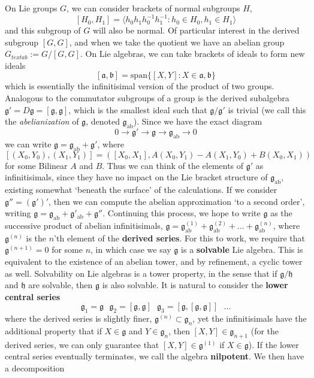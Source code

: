 On Lie groups $G$, we can consider brackets of normal subgroups $H$,
%
\[ [H_0,H_1] = \langle h_0h_1h_0^{-1}h_1^{-1} : h_0 \in H_0, h_1 \in H_1 \rangle \]
%
and this subgroup of $G$ will also be normal. Of particular interest in the derived subgroup $[G,G]$, and when we take the quotient we have an abelian group $G_{text{ab}} := G/[G,G]$. On Lie algebras, we can take brackets of ideals to form new ideals
%
\[ [\mathfrak{a}, \mathfrak{b}] = \text{span} \{ [X,Y] : X \in \mathfrak{a}, \mathfrak{b} \} \]
%
which is essentially the infinitisimal version of the product of two groups. Analogous to the commutator subgroups of a group is the derived subalgebra $\mathfrak{g}' = D\mathfrak{g} = [\mathfrak{g}, \mathfrak{g}]$, which is the smallest ideal such that $\mathfrak{g}/\mathfrak{g}'$ is trivial (we call this the {\it abelianization} of $\mathfrak{g}$, denoted $\mathfrak{g}_{\text{ab}}$). Since we have the exact diagram
%
\[ 0 \to \mathfrak{g}' \to \mathfrak{g} \to \mathfrak{g}_{\text{ab}} \to 0 \]
%
we can write $\mathfrak{g} = \mathfrak{g}_{\text{ab}} + \mathfrak{g}'$, where
%
\[ [(X_0,Y_0),(X_1,Y_1)] = ([X_0,X_1], A(X_0,Y_1) - A(X_1,Y_0) + B(X_0,X_1)) \]
%
for some Bilinear $A$ and $B$. Thus we can think of the elements of $\mathfrak{g}'$ as infinitisimals, since they have no impact on the Lie bracket structure of $\mathfrak{g}_{\text{ab}}$, existing somewhat `beneath the surface' of the calculations. If we consider $\mathfrak{g}'' = (\mathfrak{g}')'$, then we can compute the abelian approximation `to a second order', writing $\mathfrak{g} = \mathfrak{g}_{\text{ab}} + \mathfrak{g}'_{\text{ab}} + \mathfrak{g}''$. Continuing this process, we hope to write $\mathfrak{g}$ as the successive product of abelian infinitisimals, $\mathfrak{g} = \mathfrak{g}^{(1)}_{\text{ab}} + \mathfrak{g}^{(2)}_{\text{ab}} + \dots + \mathfrak{g}^{(n)}_{\text{ab}}$, where $\mathfrak{g}^{(n)}$ is the $n$'th element of the {\bf derived series}. For this to work, we require that $\mathfrak{g}^{(n+1)} = 0$ for some $n$, in which case we say $\mathfrak{g}$ is a {\bf solvable} Lie algebra. This is equivalent to the existence of an abelian tower, and by refinement, a cyclic tower as well. Solvability on Lie algebras is a tower property, in the sense that if $\mathfrak{g}/\mathfrak{h}$ and $\mathfrak{h}$ are solvable, then $\mathfrak{g}$ is also solvable. It is natural to consider the {\bf lower central series}
%
\[ \mathfrak{g}_1 = \mathfrak{g}\ \ \  \mathfrak{g}_2 = [\mathfrak{g}, \mathfrak{g}]\ \ \ \mathfrak{g}_3 = [\mathfrak{g}, [\mathfrak{g}, \mathfrak{g}]]\ \ \  \dots \]
%
where the derived series is slightly finer, $\mathfrak{g}^{(n)} \subset \mathfrak{g}_n$, yet the infinitisimals have the additional property that if $X \in \mathfrak{g}$ and $Y \in \mathfrak{g}_n$, then $[X,Y] \in \mathfrak{g}_{n+1}$ (for the derived series, we can only guarantee that $[X,Y] \in \mathfrak{g}^{(1)}$ if $X \in \mathfrak{g}$). If the lower central series eventually terminates, we call the algebra {\bf nilpotent}. We then have a decomposition

